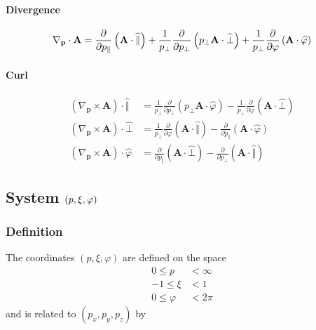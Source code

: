 \paragraph{Divergence}

\begin{equation}
\nabla_{\mathbf{p}}\cdot\mathbf{A}=\frac{\partial}{\partial p_{\Vert}}\left( 
\mathbf{A}\cdot\widehat{\Vert}\right) +\frac{1}{p_{\bot}}\frac{\partial}{
\partial p_{\bot}}\left( p_{\bot}\mathbf{A}\cdot\widehat{\bot}\right) +\frac{%
1}{p_{\bot}}\frac{\partial}{\partial\varphi}\left( \mathbf{A}\cdot\widehat{%
\varphi}\right)
\end{equation}

\paragraph{Curl}

\begin{align}
\left( \nabla_{\mathbf{p}}\times\mathbf{A}\right) \cdot\widehat{\Vert} & =%
\frac{1}{p_{\bot}}\frac{\partial}{\partial p_{\bot}}\left( p_{\bot }\mathbf{A%
}\cdot\widehat{\varphi}\right) -\frac{1}{p_{\bot}}\frac{\partial}{
\partial\varphi}\left( \mathbf{A}\cdot\widehat{\bot}\right) \\
\left( \nabla_{\mathbf{p}}\times\mathbf{A}\right) \cdot\widehat{\bot} & =%
\frac{ 1}{p_{\bot}}\frac{\partial}{\partial\varphi}\left( \mathbf{A}\cdot%
\widehat{ \Vert}\right) -\frac{\partial}{\partial p_{\Vert}}\left( \mathbf{A}%
\cdot\widehat{\varphi}\right) \\
\left( \nabla_{\mathbf{p}}\times\mathbf{A}\right) \cdot\widehat{\varphi} & =%
\frac{\partial}{\partial p_{\Vert}}\left( \mathbf{A}\cdot\widehat{\bot}
\right) -\frac{\partial}{\partial p_{\bot}}\left( \mathbf{A}\cdot\widehat{
\Vert}\right)
\end{align}

\subsection{System $\left( p,\protect\xi,\protect\varphi\right) $}

\subsubsection{Definition}

The coordinates $\left( p,\xi,\varphi\right) $ are defined on the space 
\begin{align}
0\leq p & <\infty \\
-1\leq\xi & <1 \\
0\leq\varphi & <2\pi
\end{align}
and is related to $\left( p_{x},p_{y},p_{z}\right) $ by

